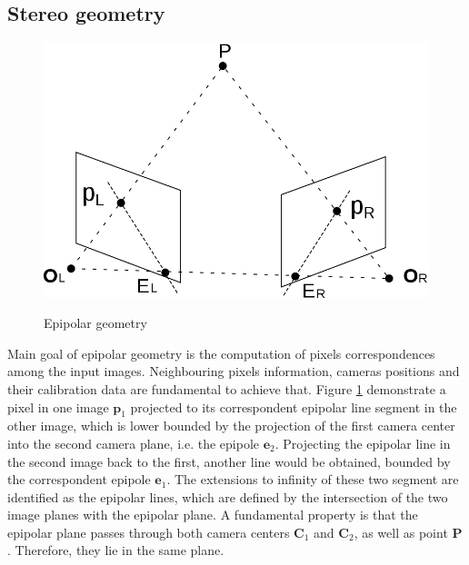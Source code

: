 \subsection{Stereo geometry}
\label{subsection:stereogeom}
\begin{figure}[t]
	\begin{center}
		{\includegraphics[width=.8\textwidth]{images/epipolar-geometry}}
\caption{Epipolar geometry}
\label{fig:epipolargeom}
	\end{center}
\end{figure}
Main goal of epipolar geometry is the computation of pixels correspondences among the input images. 
Neighbouring pixels information, cameras positions and their calibration data are fundamental to achieve that.
Figure \ref{fig:epipolargeom} demonstrate a pixel in one image $\mathbf{p}_1$ projected to its correspondent epipolar line segment in the other image, which is lower bounded by the projection of the first camera center into the second camera plane, i.e. the epipole $\mathbf{e}_2$. 
Projecting the epipolar line in the second image back to the first, another line would be obtained, bounded by the correspondent epipole $\mathbf{e}_1$. 
The extensions to infinity of these two segment are identified as the epipolar lines, which are defined by the intersection of the two image planes with the epipolar plane.
A fundamental property is that the epipolar plane passes through both camera centers $\mathbf{C}_1$ and $\mathbf{C}_2$, as well as point $\mathbf{P}$. 
Therefore, they lie in the same plane. \\

